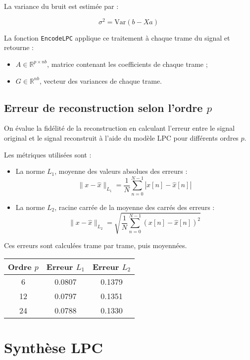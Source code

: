 \documentclass[11pt]{article}
\begin{document}
La variance du bruit est estimée par :

\[
\sigma^2 = \text{Var}(b - Xa)
\]

La fonction \texttt{EncodeLPC} applique ce traitement à chaque trame du signal et retourne :
\begin{itemize}
    \item \( A \in \mathbb{R}^{p \times nb} \), matrice contenant les coefficients de chaque trame ;
    \item \( G \in \mathbb{R}^{nb} \), vecteur des variances de chaque trame.
\end{itemize}

\subsection{Erreur de reconstruction selon l'ordre \( p \)}

On évalue la fidélité de la reconstruction en calculant l’erreur entre le signal original et le signal reconstruit à l’aide du modèle LPC pour différents ordres \( p \).

Les métriques utilisées sont :
\begin{itemize}
    \item La norme \( L_1 \), moyenne des valeurs absolues des erreurs :
    \[
    \|x - \hat{x}\|_{L_1} = \frac{1}{N} \sum_{n=0}^{N-1} |x[n] - \hat{x}[n]|
    \]
    \item La norme \( L_2 \), racine carrée de la moyenne des carrés des erreurs :
    \[
    \|x - \hat{x}\|_{L_2} = \sqrt{ \frac{1}{N} \sum_{n=0}^{N-1} (x[n] - \hat{x}[n])^2 }
    \]
\end{itemize}

Ces erreurs sont calculées trame par trame, puis moyennées. 

\begin{center}
\begin{tabular}{|c|c|c|}
\hline
Ordre \( p \) & Erreur \( L_1 \) & Erreur \( L_2 \) \\
\hline
6 & 0.0807 & 0.1379 \\
12 & 0.0797 & 0.1351 \\
24 & 0.0788 & 0.1330 \\
\hline
\end{tabular}
\end{center}

\section{Synthèse LPC}
\end{document}
